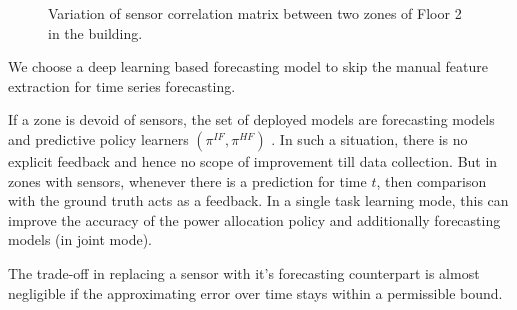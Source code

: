  
 
 \begin{figure}%
    \centering
    \qquad
    \caption{Variation of sensor correlation matrix between two zones of Floor 2 in the building. }%
    \label{fig:diffzonesamefloorcomparision}%
\end{figure}


We choose a deep learning based forecasting model to skip the manual feature extraction for time series forecasting. 

If a zone is devoid of sensors, the set of deployed models are forecasting models and predictive policy learners $(\pi^{IF}, \pi^{HF})$ . 
In such a situation, there is no explicit feedback and hence no scope of improvement till data collection.
But in zones with sensors, whenever there is a prediction for time $t$, then comparison with the ground truth acts as a feedback. 
In a single task learning mode, this can improve the accuracy of the power allocation policy and additionally forecasting models (in joint mode).

The trade-off in replacing a sensor with it's forecasting counterpart is almost negligible if the approximating error over time stays within a permissible bound. 




